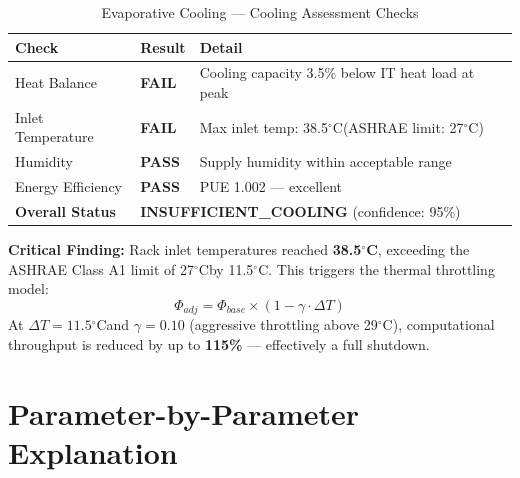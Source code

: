 \documentclass[12pt,a4paper]{report}
\newcommand{\pass}{\textcolor{passgreen}{\textbf{PASS}}}
\newcommand{\fail}{\textcolor{failred}{\textbf{FAIL}}}
\newcommand{\degC}{$^{\circ}$C}
\begin{document}
\begin{table}[H]
\centering
\caption{Evaporative Cooling --- Cooling Assessment Checks}
\label{tab:evap_assess}
\renewcommand{\arraystretch}{1.3}
\begin{tabular}{llp{8cm}}
\toprule
\textbf{Check} & \textbf{Result} & \textbf{Detail} \\
\midrule
Heat Balance & \fail & Cooling capacity 3.5\% below IT heat load at peak \\
Inlet Temperature & \fail & Max inlet temp: 38.5\degC (ASHRAE limit: 27\degC) \\
Humidity & \pass & Supply humidity within acceptable range \\
Energy Efficiency & \pass & PUE 1.002 --- excellent \\
\midrule
\textbf{Overall Status} & \multicolumn{2}{l}{\textcolor{failred}{\textbf{INSUFFICIENT\_COOLING}} (confidence: 95\%)} \\
\bottomrule
\end{tabular}
\end{table}

\noindent\textbf{Critical Finding:} Rack inlet temperatures reached \textbf{38.5\degC}, exceeding
the ASHRAE Class A1 limit of 27\degC by 11.5\degC. This triggers the thermal throttling model:
\begin{equation}
\Phi_{adj} = \Phi_{base} \times (1 - \gamma \cdot \Delta T)
\label{eq:throttle}
\end{equation}
At $\Delta T = 11.5$\degC and $\gamma = 0.10$ (aggressive throttling above 29\degC), computational
throughput is reduced by up to \textbf{115\%} --- effectively a full shutdown.

\section{Parameter-by-Parameter Explanation}
\end{document}
